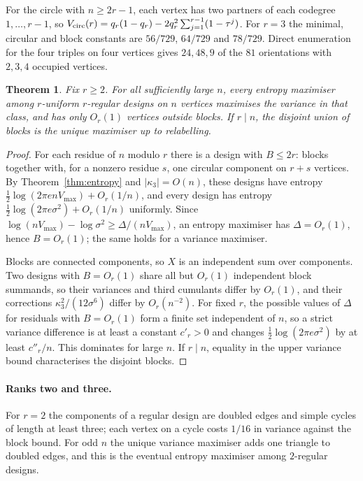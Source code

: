 \documentclass[11pt,a4paper]{article}
\newtheorem{theorem}{Theorem}[section]\newtheorem{lemma}[theorem]{Lemma}\newtheorem{proposition}[theorem]{Proposition}\newtheorem{corollary}[theorem]{Corollary}
\theoremstyle{definition}\newtheorem{remark}[theorem]{Remark}\newtheorem{conjecture}{Conjecture}
\begin{document}
For the circle with $n\ge2r-1$, each vertex has two partners of each codegree $1,\ldots,r-1$, so
$V_{\rm circ}(r)=q_r(1-q_r)-2q_r^2\sum_{j=1}^{r-1}(1-\tau^j)$. For $r=3$ the minimal, circular and block constants are $56/729$, $64/729$ and $78/729$. Direct enumeration for the four triples on four vertices gives $24,48,9$ of the $81$ orientations with $2,3,4$ occupied vertices.

\begin{theorem}\label{thm:regularmax}
Fix $r\ge2$. For all sufficiently large $n$, every entropy maximiser among $r$-uniform $r$-regular designs on $n$ vertices maximises the variance in that class, and has only $O_r(1)$ vertices outside blocks. If $r\mid n$, the disjoint union of blocks is the unique maximiser up to relabelling.
\end{theorem}
\begin{proof}
For each residue of $n$ modulo $r$ there is a design with $B\le2r$: blocks together with, for a nonzero residue $s$, one circular component on $r+s$ vertices. By Theorem~\ref{thm:entropy} and $|\kappa_3|=O(n)$, these designs have entropy $\tfrac12\log(2\pi e nV_{\max})+O_r(1/n)$, and every design has entropy $\tfrac12\log(2\pi e\sigma^2)+O_r(1/n)$ uniformly. Since $\log(nV_{\max})-\log\sigma^2\ge\Delta/(nV_{\max})$, an entropy maximiser has $\Delta=O_r(1)$, hence $B=O_r(1)$; the same holds for a variance maximiser.

Blocks are connected components, so $X$ is an independent sum over components. Two designs with $B=O_r(1)$ share all but $O_r(1)$ independent block summands, so their variances and third cumulants differ by $O_r(1)$, and their corrections $\kappa_3^2/(12\sigma^6)$ differ by $O_r(n^{-2})$. For fixed $r$, the possible values of $\Delta$ for residuals with $B=O_r(1)$ form a finite set independent of $n$, so a strict variance difference is at least a constant $c'_r>0$ and changes $\tfrac12\log(2\pi e\sigma^2)$ by at least $c''_r/n$. This dominates for large $n$. If $r\mid n$, equality in the upper variance bound characterises the disjoint blocks.
\end{proof}

\paragraph{Ranks two and three.} For $r=2$ the components of a regular design are doubled edges and simple cycles of length at least three; each vertex on a cycle costs $1/16$ in variance against the block bound. For odd $n$ the unique variance maximiser adds one triangle to doubled edges, and this is the eventual entropy maximiser among $2$-regular designs.
\end{document}
